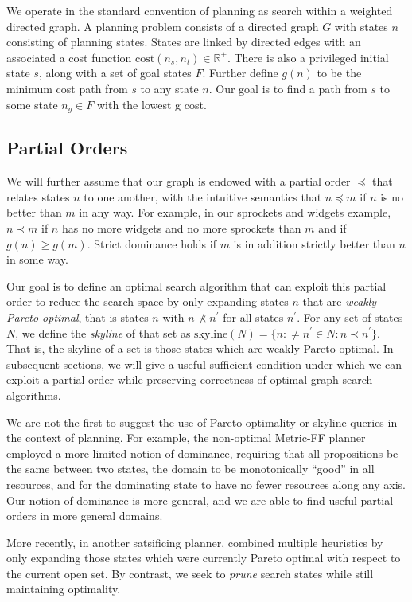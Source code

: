 \documentclass[letterpaper]{article}
\theoremstyle{plain} \newtheorem{theorem}{Theorem} \newtheorem{proposition}{Proposition} \newtheorem{lemma}{Lemma}
\theoremstyle{definition} \newtheorem{definition}{Definition} \newtheorem{conjecture}{Conjecture} \newtheorem*{example}{Example}
\theoremstyle{remark} \newtheorem*{remark}{Remark} \newtheorem*{note}{Note} \newtheorem{case}{Case}
\begin{document}
We operate in the standard convention of planning as search within
a weighted directed graph.  A planning problem consists of a directed
graph $G$ with states $n$ consisting of planning states.  States are
linked by directed edges with an associated a cost function
$\mathrm{cost}(n_s,n_t) \in \mathbb R^+$.  There is also a privileged
initial state $s$, along with a set of goal states $F$.  Further
define $g(n)$ to be the minimum cost path from $s$ to any state $n$.
Our goal is to find a path from $s$ to some state $n_g \in F$ with
the lowest g cost.


\subsection{Partial Orders}

We will further assume that our graph is endowed with a partial order $\preceq$
that relates states $n$ to one another, with the intuitive semantics that
$n \preceq m$ if $n$ is no better than $m$ in any way. For example, in
our sprockets and widgets example, $n \prec m$ if $n$ has no more widgets and
no more sprockets than $m$ and if $g(n) \ge g(m)$. Strict dominance
holds if $m$ is in addition strictly better than $n$ in some way.

Our goal is to define an optimal search algorithm that can exploit
this partial order to reduce the search space by only expanding
states $n$ that are \textit{weakly Pareto optimal}, that is states
$n$ with $n \nprec n^\prime$ for all states $n^\prime$. For any set of states
$N$, we define the \textit{skyline} of that set as
$\textrm{skyline}(N)=\{n: \ne n^\prime \in N: n \prec n^\prime\}$. That is, the
skyline of a set is those states which are weakly Pareto optimal.
In subsequent sections, we will give a useful sufficient condition
under which we can exploit a partial order while preserving correctness
of optimal graph search algorithms.

We are not the first to suggest the use of Pareto optimality or
skyline queries in the context of planning. For example, the
non-optimal Metric-FF planner~\cite{hoffmann2003metric} employed a
more limited notion of dominance, requiring that all propositions
be the same between two states, the domain to be monotonically
``good'' in all resources, and for the dominating state to have no
fewer resources along any axis. Our notion of dominance is more
general, and we are able to find useful partial orders in more general
domains.

More recently, in another satsificing planner, \citet{roger2010more}
combined multiple heuristics by only expanding those states which
were currently Pareto optimal with respect to the current open set.
By contrast, we seek to \textit{prune} search states while still
maintaining optimality.
\end{document}
